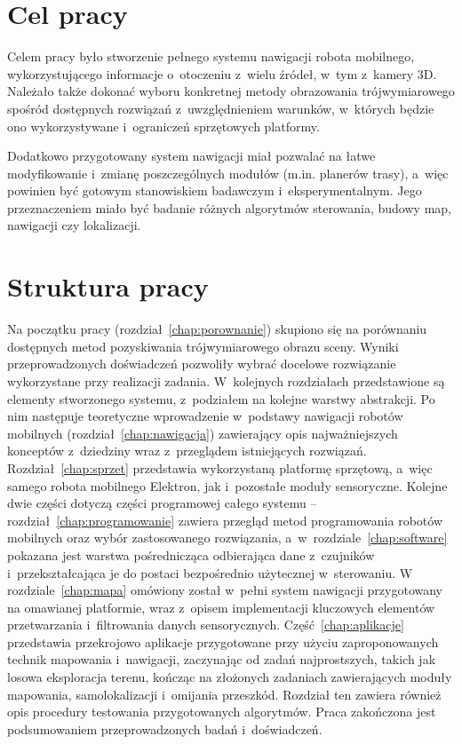\section{Cel pracy}

Celem pracy było stworzenie pełnego systemu nawigacji robota mobilnego,
wykorzystującego informacje o~otoczeniu z~wielu źródeł, w~tym z~kamery 3D.
Należało także dokonać wyboru konkretnej metody obrazowania trójwymiarowego
spośród dostępnych rozwiązań z~uwzględnieniem warunków, w~których będzie ono
wykorzystywane i~ograniczeń sprzętowych platformy.

Dodatkowo przygotowany system nawigacji miał pozwalać na łatwe modyfikowanie
i~zmianę poszczególnych modułów (m.in. planerów trasy), a~więc powinien być
gotowym stanowiskiem badawczym i~eksperymentalnym. Jego przeznaczeniem miało
być badanie różnych algorytmów sterowania, budowy map, nawigacji czy lokalizacji.


\section{Struktura pracy}

Na początku pracy (rozdział~\ref{chap:porownanie}) skupiono się na porównaniu
dostępnych metod pozyskiwania trójwymiarowego
obrazu sceny. Wyniki przeprowadzonych doświadczeń pozwoliły wybrać docelowe rozwiązanie
wykorzystane przy realizacji zadania. W~kolejnych rozdziałach przedstawione są elementy
stworzonego systemu, z~podziałem na kolejne warstwy abstrakcji. Po nim następuje
teoretyczne wprowadzenie w~podstawy nawigacji robotów mobilnych (rozdział~\ref{chap:nawigacja})
zawierający opis najważniejszych konceptów z~dziedziny wraz z~przeglądem istniejących
rozwiązań. Rozdział~\ref{chap:sprzet} przedstawia wykorzystaną platformę sprzętową,
a~więc samego robota mobilnego Elektron, jak i~pozostałe moduły sensoryczne. Kolejne
dwie części dotyczą części programowej całego systemu -- rozdział~\ref{chap:programowanie}
zawiera przegląd metod programowania robotów mobilnych oraz wybór zastosowanego rozwiązania,
a~w~rozdziale~\ref{chap:software} pokazana jest warstwa pośrednicząca odbierająca
dane z~czujników i~przekształcająca je do postaci bezpośrednio użytecznej w~sterowaniu.
W rozdziale~\ref{chap:mapa} omówiony został w~pełni system nawigacji przygotowany
na omawianej platformie, wraz z~opisem implementacji kluczowych elementów
przetwarzania i~filtrowania danych sensorycznych.
Część~\ref{chap:aplikacje} przedstawia przekrojowo aplikacje przygotowane
przy użyciu zaproponowanych technik mapowania i~nawigacji, zaczynając od zadań
najprostszych, takich jak losowa eksploracja terenu, kończąc na złożonych zadaniach
zawierających moduły mapowania, samolokalizacji i~omijania przeszkód. Rozdział ten
zawiera również opis procedury testowania przygotowanych algorytmów. Praca zakończona
jest podsumowaniem przeprowadzonych badań i~doświadczeń.


